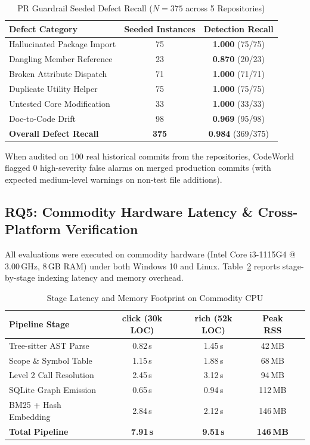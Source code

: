 \documentclass[conference]{IEEEtran}
\begin{document}
\begin{table}[htbp]
\caption{PR Guardrail Seeded Defect Recall ($N=375$ across 5 Repositories)}
\label{tab:guardrails}
\centering
\small
\begin{tabular}{lcc}
\toprule
\textbf{Defect Category} & \textbf{Seeded Instances} & \textbf{Detection Recall} \\
\midrule
Hallucinated Package Import    & 75  & \textbf{1.000} (75/75) \\
Dangling Member Reference      & 23  & \textbf{0.870} (20/23) \\
Broken Attribute Dispatch      & 71  & \textbf{1.000} (71/71) \\
Duplicate Utility Helper       & 75  & \textbf{1.000} (75/75) \\
Untested Core Modification     & 33  & \textbf{1.000} (33/33) \\
Doc-to-Code Drift              & 98  & \textbf{0.969} (95/98) \\
\midrule
\textbf{Overall Defect Recall} & \textbf{375} & \textbf{0.984} (369/375) \\
\bottomrule
\end{tabular}
\end{table}

When audited on 100 real historical commits from the repositories, CodeWorld flagged 0 high-severity false alarms on merged production commits (with expected medium-level warnings on non-test file additions).

\subsection{RQ5: Commodity Hardware Latency \& Cross-Platform Verification}
All evaluations were executed on commodity hardware (Intel Core i3-1115G4 @ 3.00\,GHz, 8\,GB RAM) under both Windows 10 and Linux. Table~\ref{tab:hardware_latencies} reports stage-by-stage indexing latency and memory overhead.

\begin{table}[htbp]
\caption{Stage Latency and Memory Footprint on Commodity CPU}
\label{tab:hardware_latencies}
\centering
\small
\begin{tabular}{lcccc}
\toprule
\textbf{Pipeline Stage} & \textbf{click (30k LOC)} & \textbf{rich (52k LOC)} & \textbf{Peak RSS} \\
\midrule
Tree-sitter AST Parse   & 0.82\,s                  & 1.45\,s                 & 42\,MB \\
Scope \& Symbol Table   & 1.15\,s                  & 1.88\,s                 & 68\,MB \\
Level 2 Call Resolution & 2.45\,s                  & 3.12\,s                 & 94\,MB \\
SQLite Graph Emission   & 0.65\,s                  & 0.94\,s                 & 112\,MB \\
BM25 + Hash Embedding   & 2.84\,s                  & 2.12\,s                 & 146\,MB \\
\midrule
\textbf{Total Pipeline} & \textbf{7.91\,s}         & \textbf{9.51\,s}        & \textbf{146\,MB} \\
\bottomrule
\end{tabular}
\end{table}
\end{document}
